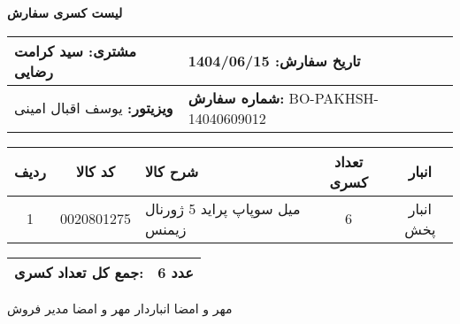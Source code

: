 \documentclass[a4paper,12pt]{article}
\begin{document}
\begin{center}
    {\Huge \textbf{   لیست کسری سفارش   }} \\
\end{center}

\vspace{0.5cm}

\noindent
\begin{tabular}{|p{7cm}|p{7cm}|}
\hline
\textbf{مشتری:} سید کرامت رضایی & \textbf{تاریخ سفارش:} 1404/06/15 \\
\hline
\textbf{ویزیتور:} یوسف اقبال امینی & \textbf{شماره سفارش:} BO-PAKHSH-14040609012 \\
\hline
\end{tabular}

\vspace{0.5cm}

\begin{longtable}{|c|c|p{6cm}|c|c|}
\hline
\rowcolor{headerblue} \color{white}
\textbf{ردیف} &  \textbf{کد کالا} & \textbf{شرح کالا} & \textbf{تعداد کسری} & \textbf{انبار} \\
\hline
\endhead
1 & 0020801275 & میل سوپاپ پراید 5 ژورنال زیمنس & 6 & انبار پخش \\
\hline

\end{longtable}

\vspace{0.3cm}
\noindent
\begin{tabular}{|p{7cm}|p{7cm}|}
\hline
\textbf{جمع کل تعداد کسری:} & 6 عدد \\
\hline
\end{tabular}

\vspace{1.5cm}

\noindent
مهر و امضا انباردار \hspace{8cm} مهر و امضا مدیر فروش
\end{document}
